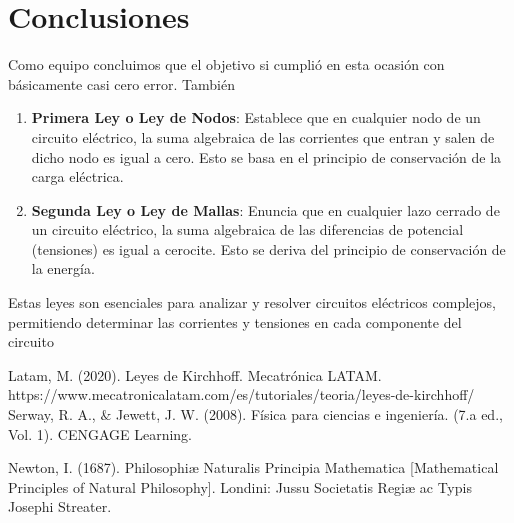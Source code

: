\documentclass{article}
\begin{document}
\section{Conclusiones}\label{Conclusiones}				%
Como equipo concluimos que el objetivo si cumplió en esta ocasión con básicamente casi cero error. 
También 
\begin{enumerate}
\item \textbf{Primera Ley o Ley de Nodos}: Establece que en cualquier nodo de un circuito eléctrico, la suma algebraica de las corrientes que entran y salen de dicho nodo es igual a cero. Esto se basa en el principio de conservación de la carga eléctrica.

\item \textbf{Segunda Ley o Ley de Mallas}: Enuncia que en cualquier lazo cerrado de un circuito eléctrico, la suma algebraica de las diferencias de potencial (tensiones) es igual a cerocite. Esto se deriva del principio de conservación de la energía.
\end{enumerate}
Estas leyes son esenciales para analizar y resolver circuitos eléctricos complejos, permitiendo determinar las corrientes y tensiones en cada componente del circuito
\begin{thebibliography}{9}						%
    Latam, M. (2020). Leyes de Kirchhoff. Mecatrónica LATAM. https://www.mecatronicalatam.com/es/tutoriales/teoria/leyes-de-kirchhoff/
	Serway, R. A., $\&$ Jewett, J. W. (2008). Física para ciencias e ingeniería. (7.a
ed., Vol. 1). CENGAGE Learning.

	Newton, I. (1687). Philosophiæ Naturalis Principia Mathematica [Mathematical Principles of Natural Philosophy]. Londini: Jussu Societatis Regiæ ac Typis Josephi Streater.

\end{thebibliography}
\end{document}
